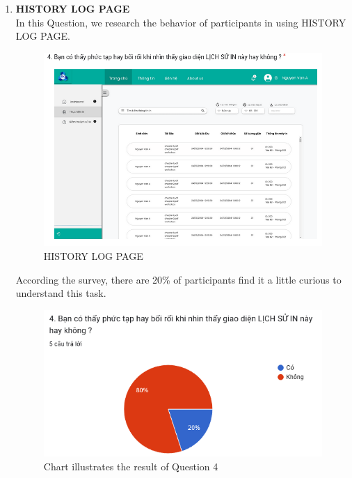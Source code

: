 \begin{enumerate}
    \item \textbf{HISTORY LOG PAGE} \\
    In this Question, we research the behavior of participants in using HISTORY LOG PAGE.
\begin{figure}[!h]
    \centering
    \includegraphics[width=0.8\linewidth]{images/image_uasbility/Q4_SPSO.png}
    \caption{HISTORY LOG PAGE}
    \label{fig:HISTORY LOG PAGE}
\end{figure}
\newpage
According the survey, there are 20\% of participants find it a little curious to understand this task.
\begin{figure}[!h]
    \centering
    \includegraphics[width=0.8\linewidth]{images/image_uasbility/A4_SPSO.png}
    \caption{Chart illustrates the result of Question 4}
    \label{fig:Chart illustrates the result of Question 4}
\end{figure}
\end{enumerate}

\newpage
